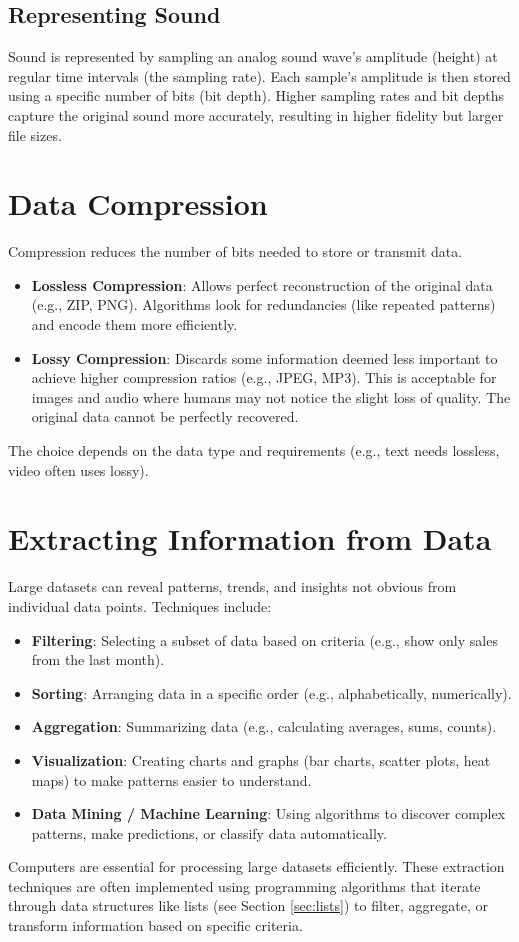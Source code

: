 \documentclass[11pt,oneside]{book}
\begin{document}
\subsection*{Representing Sound}
Sound is represented by sampling an analog sound wave's amplitude (height) at regular time intervals (the sampling rate). Each sample's amplitude is then stored using a specific number of bits (bit depth). Higher sampling rates and bit depths capture the original sound more accurately, resulting in higher fidelity but larger file sizes.

\section{Data Compression}
\label{sec:data_compression}
Compression reduces the number of bits needed to store or transmit data.
\begin{itemize}
    \item \textbf{Lossless Compression}: Allows perfect reconstruction of the original data (e.g., ZIP, PNG). Algorithms look for redundancies (like repeated patterns) and encode them more efficiently.
    \item \textbf{Lossy Compression}: Discards some information deemed less important to achieve higher compression ratios (e.g., JPEG, MP3). This is acceptable for images and audio where humans may not notice the slight loss of quality. The original data cannot be perfectly recovered.
\end{itemize}
The choice depends on the data type and requirements (e.g., text needs lossless, video often uses lossy).

\section{Extracting Information from Data}
\label{sec:extracting_info}
Large datasets can reveal patterns, trends, and insights not obvious from individual data points. Techniques include:
\begin{itemize}
    \item \textbf{Filtering}: Selecting a subset of data based on criteria (e.g., show only sales from the last month).
    \item \textbf{Sorting}: Arranging data in a specific order (e.g., alphabetically, numerically).
    \item \textbf{Aggregation}: Summarizing data (e.g., calculating averages, sums, counts).
    \item \textbf{Visualization}: Creating charts and graphs (bar charts, scatter plots, heat maps) to make patterns easier to understand.
    \item \textbf{Data Mining / Machine Learning}: Using algorithms to discover complex patterns, make predictions, or classify data automatically.
\end{itemize}
Computers are essential for processing large datasets efficiently. These extraction techniques are often implemented using programming algorithms that iterate through data structures like lists (see Section \ref{sec:lists}) to filter, aggregate, or transform information based on specific criteria.
\end{document}
